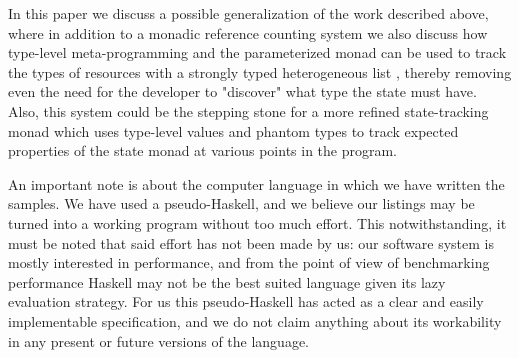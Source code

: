 In this paper we discuss a possible generalization of the work described above, where in addition to a monadic reference counting system we also discuss how type-level meta-programming \cite{3_1,3_2,3_3,6_1} and the parameterized monad \cite{1_7} can be used to track the types of resources with a strongly typed heterogeneous list \cite{4_1}, thereby removing even the need for the developer to "discover" what type the state must have. Also, this system could be the stepping stone for a more refined state-tracking monad which uses type-level values and phantom types to track expected properties of the state monad at various points in the program.


An important note is about the computer language in which we have written the samples. We have used a pseudo-Haskell, and we believe our listings may be turned into a working program without too much effort. This notwithstanding, it must be noted that said effort has not been made by us: our software system is mostly interested in performance, and from the point of view of benchmarking performance Haskell may not be the best suited language given its lazy evaluation strategy. For us this pseudo-Haskell has acted as a clear and easily implementable specification, and we do not claim anything about its workability in any present or future versions of the language.
 
